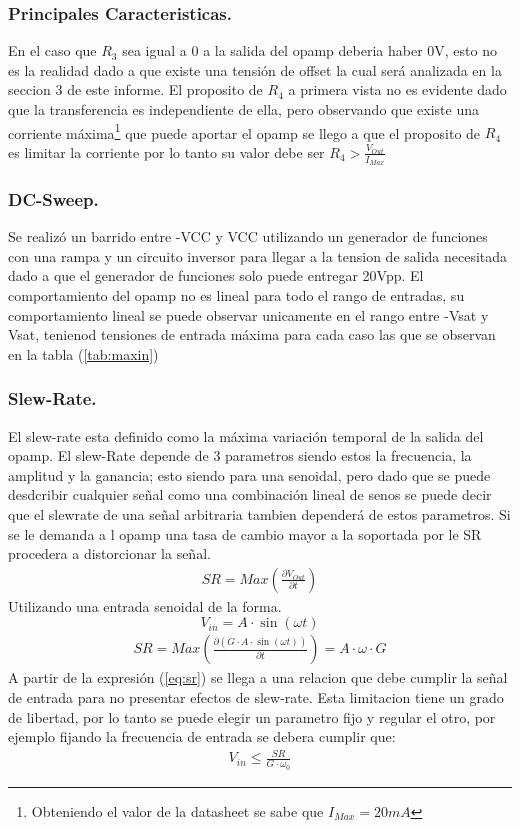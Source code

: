\subsubsection{Principales Caracteristicas.}
En el caso que $R_3$ sea igual a 0 a la salida del opamp deberia haber 0V, esto no es la realidad dado a que existe una tensión de offset la cual será analizada en la seccion 3 de este informe.
El proposito de $R_4$ a primera vista no es evidente dado que la transferencia es independiente de ella, pero observando que existe una corriente máxima\footnote{Obteniendo el valor de la datasheet se sabe que $I_{Max}=20mA$} que puede aportar el opamp se llego a  que el proposito de $R_4$ es limitar la corriente por lo tanto su valor debe ser $R_4>\frac{V_{Out}}{I_{Max}}$ 
\subsubsection{DC-Sweep.}
Se realizó un barrido entre -VCC y VCC utilizando un generador de funciones con una rampa y un circuito inversor para llegar a la tension de salida necesitada dado a que el generador de funciones solo puede entregar 20Vpp.
El comportamiento del opamp no es lineal para todo el rango de entradas, su comportamiento lineal se puede observar unicamente en el rango entre -Vsat y Vsat, tenienod tensiones de entrada máxima para cada caso las que se observan en la tabla (\ref{tab:maxin})
\subsubsection{Slew-Rate.}
El slew-rate esta definido como la máxima variación temporal de la salida del opamp. El slew-Rate depende de 3 parametros siendo estos la frecuencia, la amplitud y la ganancia; esto siendo para una senoidal, pero dado que se puede desdcribir cualquier señal como una combinación lineal de senos se puede decir que el slewrate de una señal arbitraria tambien dependerá de estos parametros.
Si se le demanda a l opamp una tasa de cambio mayor a la soportada por le SR procedera a distorcionar la señal.
\begin{align}  SR= Max\left( \frac{\partial V_{Out}}{\partial t}\right)  \end{align}
Utilizando una entrada senoidal de la forma.
$$V_{in}=A\cdot \sin (\omega t)$$
\begin{align}  \label{eq:sr} SR= Max\left( \frac{\partial (G\cdot A\cdot \sin (\omega t))}{\partial t}\right) = A \cdot \omega \cdot G  \end{align}
A partir de la expresión  (\ref{eq:sr}) se llega a una relacion que debe cumplir la señal de entrada para no presentar efectos de slew-rate. Esta limitacion tiene un grado de libertad, por lo tanto se puede elegir un parametro fijo y regular el otro, por ejemplo fijando la frecuencia de entrada se debera cumplir que:
\begin{align} V_{in}	\leq \frac{SR}{G\cdot \omega_0}\end{align}


